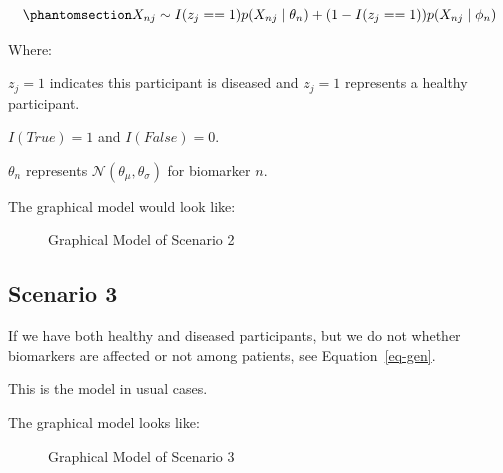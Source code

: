\documentclass[
  letterpaper,
  DIV=11,
  numbers=noendperiod]{scrreprt}
\begin{document}
\begin{equation}\phantomsection\label{eq-gen-s2}{
X_{nj} \sim I(z_j == 1) p(X_{nj} \mid \theta_n) + (1-I(z_j == 1))p(X_{nj} \mid \phi_n)
}\end{equation}

Where:

\(z_j = 1\) indicates this participant is diseased and \(z_j = 1\)
represents a healthy participant.

\(I(True) = 1\) and \(I(False) = 0\).

\(\theta_{n}\) represents \(\mathcal N(\theta_{\mu}, \theta_{\sigma})\)
for biomarker \(n\).

The graphical model would look like:

\begin{figure}


\caption{\label{fig-g2}Graphical Model of Scenario 2}

\end{figure}%

\subsection{Scenario 3}\label{scenario-3}

If we have both healthy and diseased participants, but we do not whether
biomarkers are affected or not among patients, see
Equation~\ref{eq-gen}.

This is the model in usual cases.

The graphical model looks like:

\begin{figure}


\caption{\label{fig-g3}Graphical Model of Scenario 3}

\end{figure}%
\end{document}
